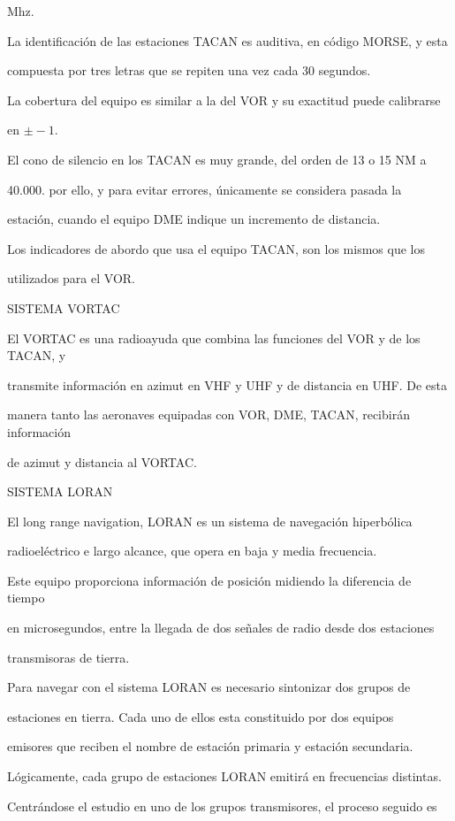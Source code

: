Mhz.

La identificación de las estaciones TACAN es auditiva, en código MORSE, y esta

compuesta por tres letras que se repiten una vez cada 30 segundos.

La cobertura del equipo es similar a la del VOR y su exactitud puede calibrarse

en $\pm- 1 $.

El cono de silencio en los TACAN es muy grande, del orden de 13 o 15 NM a

40.000. por ello, y para evitar errores, únicamente se considera pasada la

estación, cuando el equipo DME indique un incremento de distancia.

Los indicadores de abordo que usa el equipo TACAN, son los mismos que los

utilizados para el VOR.

SISTEMA VORTAC

El VORTAC es una radioayuda que combina las funciones del VOR y de los TACAN, y

transmite información en azimut en VHF y UHF y de distancia en UHF. De esta

manera tanto las aeronaves equipadas con VOR, DME, TACAN, recibirán información

de azimut y distancia al VORTAC.

SISTEMA LORAN

El long range navigation, LORAN es un sistema de navegación hiperbólica

radioeléctrico e largo alcance, que opera en baja y media frecuencia.

Este equipo proporciona información de posición midiendo la diferencia de tiempo

en microsegundos, entre la llegada de dos señales de radio desde dos estaciones

transmisoras de tierra.

Para navegar con el sistema LORAN es necesario sintonizar dos grupos de

estaciones en tierra. Cada uno de ellos esta constituido por dos equipos

emisores que reciben el nombre de estación primaria y estación secundaria.

Lógicamente, cada grupo de estaciones LORAN emitirá en frecuencias distintas.

Centrándose el estudio en uno de los grupos transmisores, el proceso seguido es

